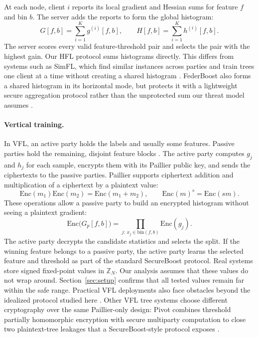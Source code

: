 \documentclass[11pt]{article}
\begin{document}
At each node, client $i$ reports its local gradient and Hessian sums for feature $f$ and bin $b$. The server adds the reports to form the global histogram:
\begin{equation}
G[f,b] = \sum_{i=1}^K g^{(i)}[f,b], \qquad
H[f,b] = \sum_{i=1}^K h^{(i)}[f,b].
\label{eq:hflagg}
\end{equation}
The server scores every valid feature-threshold pair and selects the pair with the highest gain. Our HFL protocol sums histograms directly. This differs from systems such as SimFL, which find similar instances across parties and train trees one client at a time without creating a shared histogram \cite{li2020fedgbdt}. FederBoost also forms a shared histogram in its horizontal mode, but protects it with a lightweight secure aggregation protocol rather than the unprotected sum our threat model assumes \cite{tian2020federboost}.

\paragraph{Vertical training.}
In VFL, an active party holds the labels and usually some features. Passive parties hold the remaining, disjoint feature blocks \cite{cheng2021secureboost}. The active party computes $g_j$ and $h_j$ for each sample, encrypts them with its Paillier public key, and sends the ciphertexts to the passive parties. Paillier supports ciphertext addition and multiplication of a ciphertext by a plaintext value:
\begin{equation}
\mathrm{Enc}(m_1)\mathrm{Enc}(m_2)=\mathrm{Enc}(m_1+m_2), \qquad
\mathrm{Enc}(m)^s=\mathrm{Enc}(sm).
\label{eq:paillier}
\end{equation}
These operations allow a passive party to build an encrypted histogram without seeing a plaintext gradient:
\begin{equation}
\mathrm{Enc}\bigl(G_p[f,b]\bigr)
= \prod_{j:\,x_j\in\mathrm{bin}(f,b)} \mathrm{Enc}(g_j).
\label{eq:vflagg}
\end{equation}
The active party decrypts the candidate statistics and selects the split. If the winning feature belongs to a passive party, the active party learns the selected feature and threshold as part of the standard SecureBoost protocol. Real systems store signed fixed-point values in $\mathbb{Z}_N$. Our analysis assumes that these values do not wrap around. Section~\ref{sec:setup} confirms that all tested values remain far within the safe range. Practical VFL deployments also face obstacles beyond the idealized protocol studied here \cite{wu2025vflpractice}. Other VFL tree systems choose different cryptography over the same Paillier-only design: Pivot combines threshold partially homomorphic encryption with secure multiparty computation to close two plaintext-tree leakages that a SecureBoost-style protocol exposes \cite{wu2020pivot}.
\end{document}
